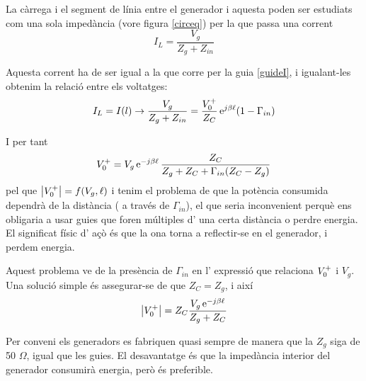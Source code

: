 La càrrega i el segment de línia entre el generador i aquesta poden ser estudiats com una sola impedància (vore figura \cref{circeq})  per la que passa una corrent
\begin{equation}
  I_L = \frac{V_g}{Z_g + Z_{in}}
\end{equation}

Aquesta corrent ha de ser igual a la que corre per la guia \cref{guideI}, i igualant-les obtenim la relació entre els voltatges:
\begin{equation}
  I_L = I(l) \to \frac{V_g}{Z_g + Z_{in}} = \frac{V_0 ^+}{Z_C} \operatorname{e}^{j \beta \ell} (1 - \Gamma _{in})
\end{equation}

I per tant
\begin{equation}
  V_0 ^+ = V_g \operatorname{e}^{- j \beta \ell} \frac{Z_C}{Z_g + Z_C + \Gamma _{in}(Z_C - Z_g)}
\end{equation}
pel que $\left\rvert V_0 ^+ \right\lvert = f(V_g, \ell)$ i tenim el problema de que la potència consumida dependrà de la distància ( a través de $\Gamma_{in}$), el que seria inconvenient perquè ens obligaria a usar guies que foren múltiples d' una certa distància o perdre energia. El significat físic d' açò és que la ona torna a reflectir-se en el generador, i perdem energia.

Aquest problema ve de la presència de $\Gamma _{in}$ en l' expressió que relaciona $V_0 ^+$ i $V_g$. Una solució simple és assegurar-se de que $Z_C = Z_g$, i així
\begin{equation}
  \left\rvert V_0 ^+ \right\lvert = Z_C \frac{V_g \operatorname{e}^{- j \beta \ell }}{Z_g + Z_C}
\end{equation}

Per conveni els generadors es fabriquen quasi sempre de manera que la $Z_g$ siga de 50 $\Omega$, igual que les guies. El desavantatge és que la impedància interior del generador consumirà energia, però és preferible.